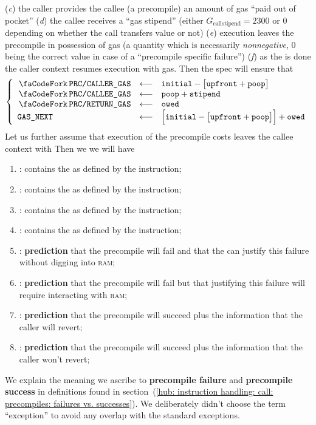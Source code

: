 (\emph{c}) the caller provides the callee (a precompile) an amount \herePoop{} of gas ``paid out of pocket''
(\emph{d}) the callee receives a ``gas stipend'' \hereStipend{} (either $G_\text{callstipend} = 2300$ or $0$ depending on whether the call transfers value or not)
(\emph{e}) execution leaves the precompile in possession of \hereOwed{} gas (a quantity which is necessarily \emph{nonnegative}, $0$ being the correct value in case of a ``precompile specific failure'') 
(\emph{f}) as the  is done the caller context resumes execution with \gasNext{} gas.
Then the spec will ensure that
\[
	\left\{ \begin{array}{lcl}
		\scenPrcCurrentlyValidCallerGas      & \longleftarrow & \hereInitial - \big[ \hereUpfront + \herePoop \big]                                \\
		\scenPrcGasAllowance                 & \longleftarrow & \herePoop + \hereStipend                                                           \\
		\scenPrcGasOwedToCaller              & \longleftarrow & \hereOwed{}                                                                        \\
		\gasNext                             & \longleftarrow & \Big[ \hereInitial - \big[ \hereUpfront + \herePoop \big] \Big] + \hereOwed{}      \\
	\end{array} \right.
\]
Let us further assume that execution of the precompile costs leaves the callee context with \hereOwed{}
Then we we will have 
\begin{enumerate}[resume]
	\item \scenPrcCdo:
		contains the \CDO{} as defined by the  instruction;
	\item \scenPrcCds:
		contains the \CDS{} as defined by the  instruction;
	\item \scenPrcRao:
		contains the \RAO{} as defined by the  instruction;
	\item \scenPrcRac:
		contains the \RAC{} as defined by the  instruction;
	\item \scenPrcFailureKnownToHub:
		\textbf{prediction} that the precompile will fail and that the \hubMod{} can justify this failure without digging into \textsc{ram}; 
	\item \scenPrcFailureKnownToRam:
		\textbf{prediction} that the precompile will fail but that justifying this failure will require interacting with \textsc{ram};
	\item \scenPrcSuccessWillRevert:
		\textbf{prediction} that the precompile will succeed plus the information that the caller will revert;
	\item \scenPrcSuccessWontRevert:
		\textbf{prediction} that the precompile will succeed plus the information that the caller won't revert;
\end{enumerate}
\saNote{} We explain the meaning we ascribe to \textbf{precompile failure} and \textbf{precompile success} in definitions found in section~(\ref{hub: instruction handling: call: precompiles: failures vs. successes}).
We deliberately didn't choose the term ``exception'' to avoid any overlap with the standard \evm{} exceptions. 
